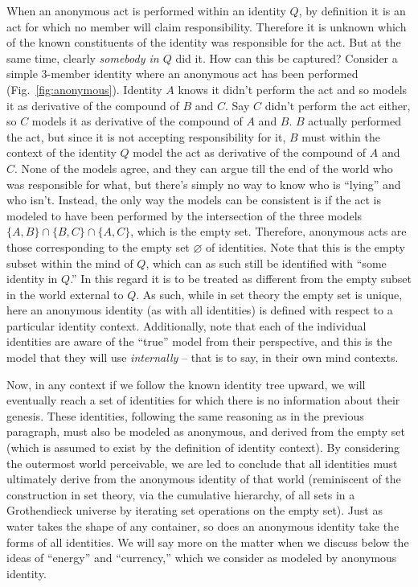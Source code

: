 \documentclass[pra,twocolumn,groupedaddress,10pt]{revtex4}
\theoremstyle{definition}
\begin{document}
When an anonymous act is performed within an identity $Q$, by definition it is an act for which no member will claim responsibility. Therefore it is unknown which of the known constituents of the identity was responsible for the act. But at the same time, clearly \textit{somebody in $Q$} did it. How can this be captured? Consider a simple 3-member identity where an anonymous act has been performed (Fig.~\ref{fig:anonymous}). Identity $A$ knows it didn't perform the act and so models it as derivative of the compound of $B$ and $C$. Say $C$ didn't perform the act either, so $C$ models it as derivative of the compound of $A$ and $B$. $B$ actually performed the act, but since it is not accepting responsibility for it, $B$ must within the context of the identity $Q$ model the act as derivative of the compound of $A$ and $C$. None of the models agree, and they can argue till the end of the world who was responsible for what, but there's simply no way to know who is ``lying'' and who isn't. Instead, the only way the models can be consistent is if the act is modeled to have been performed by the intersection of the three models $\{A, B\} \cap \{B, C\} \cap \{A, C\}$, which is the empty set. Therefore, anonymous acts are those corresponding to the empty set $\varnothing$ of identities. Note that this is the empty subset within the mind of $Q$, which can as such still be identified with ``some identity in $Q$.'' In this regard it is to be treated as different from the empty subset in the world external to $Q$. As such, while in set theory the empty set is unique, here an anonymous identity (as with all identities) is defined with respect to a particular identity context. Additionally, note that each of the individual identities are aware of the ``true'' model from their perspective, and this is the model that they will use \textit{internally} -- that is to say, in their own mind contexts.

Now, in any context if we follow the known identity tree upward, we will eventually reach a set of identities for which there is no information about their genesis. These identities, following the same reasoning as in the previous paragraph, must also be modeled as anonymous, and derived from the empty set (which is assumed to exist by the definition of identity context). By considering the outermost world perceivable, we are led to conclude that all identities must ultimately derive from the anonymous identity of that world (reminiscent of the construction in set theory, via the cumulative hierarchy, of all sets in a Grothendieck universe by iterating set operations on the empty set). Just as water takes the shape of any container, so does an anonymous identity take the forms of all identities. We will say more on the matter when we discuss below the ideas of ``energy'' and ``currency,'' which we consider as modeled by anonymous identity.
\end{document}
